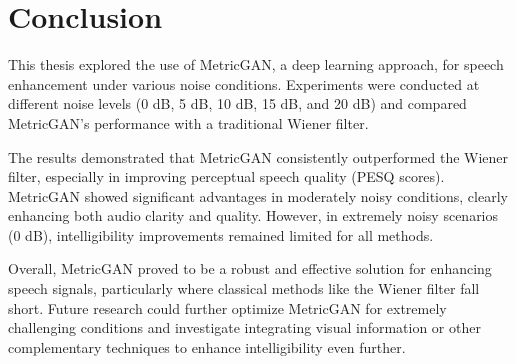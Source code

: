 \chapter{Conclusion}

This thesis explored the use of MetricGAN, a deep learning approach, for speech enhancement under various noise conditions. Experiments were conducted at different noise levels (0 dB, 5 dB, 10 dB, 15 dB, and 20 dB) and compared MetricGAN's performance with a traditional Wiener filter.

The results demonstrated that MetricGAN consistently outperformed the Wiener filter, especially in improving perceptual speech quality (PESQ scores). MetricGAN showed significant advantages in moderately noisy conditions, clearly enhancing both audio clarity and quality. However, in extremely noisy scenarios (0 dB), intelligibility improvements remained limited for all methods.

Overall, MetricGAN proved to be a robust and effective solution for enhancing speech signals, particularly where classical methods like the Wiener filter fall short. Future research could further optimize MetricGAN for extremely challenging conditions and investigate integrating visual information or other complementary techniques to enhance intelligibility even further.

